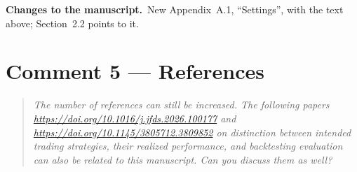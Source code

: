 \documentclass[11pt,a4paper]{article}
\newenvironment{reviewer}{\par\medskip\noindent\begin{quote}\itshape}{\end{quote}\par}
\newcommand{\changes}{\par\medskip\noindent\textbf{Changes to the manuscript.}\ }
\begin{document}
\changes New Appendix~A.1, ``Settings'', with the text above; Section~2.2 points to it.

\section*{Comment 5 --- References}
\begin{reviewer}
The number of references can still be increased. The following papers \url{https://doi.org/10.1016/j.jfds.2026.100177} and \url{https://doi.org/10.1145/3805712.3809852} on distinction between intended trading strategies, their realized performance, and backtesting evaluation can also be related to this manuscript. Can you discuss them as well?
\end{reviewer}
\end{document}
